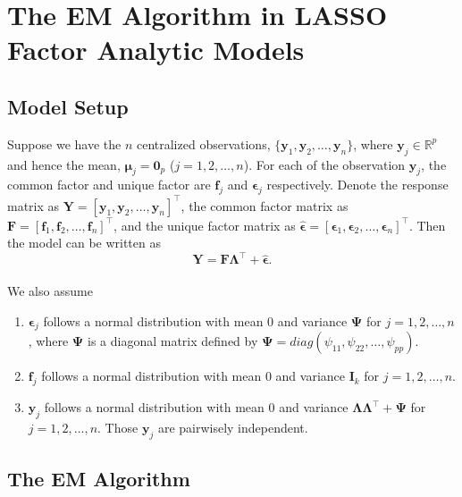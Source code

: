 \documentclass[
  a4paper,
  oneside,
  openany,
  12pt,
  onecolumn]{book}
\theoremstyle{plain}
\theoremstyle{remark}
\begin{document}
\chapter{The EM Algorithm in LASSO Factor Analytic
Models}\label{the-em-algorithm-in-lasso-factor-analytic-models}

\section{Model Setup}\label{model-setup}

Suppose we have the \(n\) centralized observations,
\(\{\boldsymbol{y}_1,\boldsymbol{y}_2,\dots,\boldsymbol{y}_n\}\), where
\(\boldsymbol{y}_j\in \mathbb{R}^p\) and hence the mean,
\(\boldsymbol{\mu}_j=\boldsymbol{0}_p\) (\(j=1,2,\dots,n\)). For each of
the observation \(\boldsymbol{y}_j\), the common factor and unique
factor are \(\boldsymbol{f}_j\) and \(\boldsymbol{\epsilon}_j\)
respectively. Denote the response matrix as
\(\boldsymbol{Y}=[\boldsymbol{y}_1,\boldsymbol{y}_2,\dots,\boldsymbol{y}_n]^\top\),
the common factor matrix as
\(\boldsymbol{F}=[\boldsymbol{f}_1,\boldsymbol{f}_2,\dots,\boldsymbol{f}_n]^\top\),
and the unique factor matrix as
\(\boldsymbol{\hat\epsilon}=[\boldsymbol{\epsilon}_1,\boldsymbol{\epsilon}_2,\dots,\boldsymbol{\epsilon}_n]^\top\).
Then the model can be written as
\[\boldsymbol{Y}=\boldsymbol{F}\boldsymbol{\Lambda}^\top+\boldsymbol{\hat\epsilon}.\]\\
We also assume

\begin{enumerate}
\def\labelenumi{\arabic{enumi}.}
\item
  \(\boldsymbol{\epsilon}_j\) follows a normal distribution with mean
  \(0\) and variance \(\boldsymbol{\Psi}\) for \(j=1,2,\dots,n\), where
  \(\boldsymbol{\Psi}\) is a diagonal matrix defined by
  \(\boldsymbol{\Psi}=diag(\psi_{11},\psi_{22},\dots,\psi_{pp})\).
\item
  \(\boldsymbol{f}_j\) follows a normal distribution with mean \(0\) and
  variance \(\boldsymbol{I}_k\) for \(j=1,2,\dots,n\).
\item
  \(\boldsymbol{y}_j\) follows a normal distribution with mean \(0\) and
  variance
  \(\boldsymbol{\Lambda}\boldsymbol{\Lambda}^\top+\boldsymbol{\Psi}\)
  for \(j=1,2,\dots,n\). Those \(\boldsymbol{y}_j\) are pairwisely
  independent.
\end{enumerate}

\section{The EM Algorithm}\label{the-em-algorithm}
\end{document}
